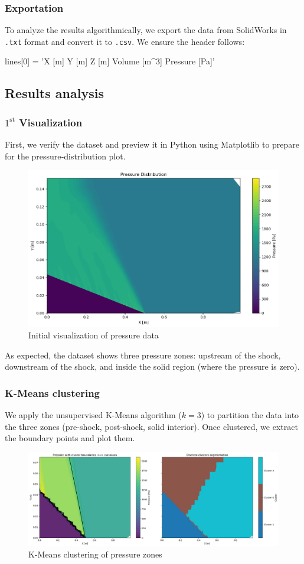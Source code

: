 \subsubsection{Exportation}

To analyze the results algorithmically, we export the data from SolidWorks in \texttt{.txt} format and convert it to \texttt{.csv}. We ensure the header follows:
\begin{pycode}
lines[0] = 'X [m] Y [m] Z [m] Volume [m^3] Pressure [Pa]\n'
\end{pycode}

\subsection{Results analysis}

\subsubsection{\(1^{\text{st}}\) Visualization}

First, we verify the dataset and preview it in Python using Matplotlib to prepare for the pressure‐distribution plot.
\begin{figure}[H]
    \centering
    \includegraphics[width=0.5\linewidth]{ressources/figures/PressureDistribution.png}
    \caption{Initial visualization of pressure data}
    \label{fig:first_visualization}
\end{figure}
As expected, the dataset shows three pressure zones: upstream of the shock, downstream of the shock, and inside the solid region (where the pressure is zero).

\subsubsection{K-Means clustering}

We apply the unsupervised K-Means algorithm (\(k=3\)) to partition the data into the three zones (pre-shock, post-shock, solid interior). Once clustered, we extract the boundary points and plot them.
\begin{figure}[H]
    \centering
    \includegraphics[width=0.8\linewidth]{ressources/figures/Kmeans.png}
    \caption{K-Means clustering of pressure zones}
    \label{fig:clustering}
\end{figure}

